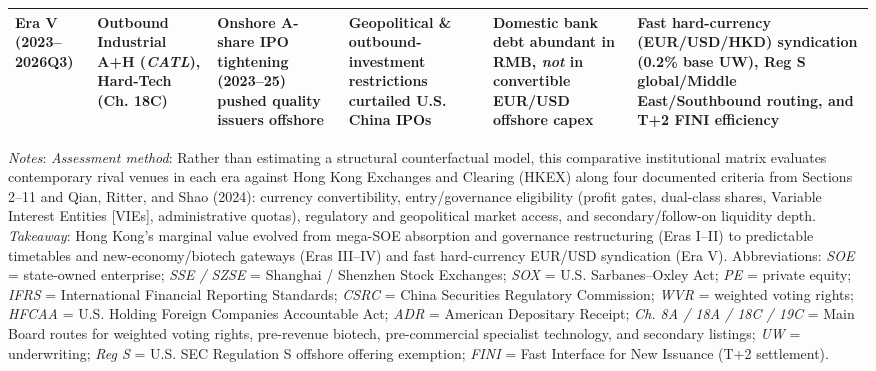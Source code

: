 \documentclass[11pt,letterpaper]{article}
\begin{document}
\begin{table}[!htbp]
\begin{adjustbox}{max width=\textwidth,max totalheight=0.79\textheight}
\begin{minipage}{\textwidth}
\begin{adjustbox}{max width=\textwidth}
\begin{tabular}{l>{\raggedright\arraybackslash}p{2.90cm}>{\raggedright\arraybackslash}p{2.90cm}>{\raggedright\arraybackslash}p{2.90cm}>{\raggedright\arraybackslash}p{2.90cm}>{\raggedright\arraybackslash}p{2.90cm}}
\textbf{Era V (2023–2026Q3)} & Outbound Industrial A+H (\textit{CATL}), Hard-Tech (Ch. 18C) & Onshore \textbf{A-share IPO tightening (2023–25)} pushed quality issuers offshore & Geopolitical \& outbound-investment restrictions curtailed U.S. China IPOs & Domestic bank debt abundant in RMB, \textit{not} in convertible EUR/USD offshore capex & \textbf{Fast hard-currency (EUR/USD/HKD) syndication (0.2\% base UW), Reg S global/Middle East/Southbound routing, and T+2 FINI efficiency} \\
\bottomrule
\end{tabular}
\end{adjustbox}
\end{minipage}
\end{adjustbox}
\par\vspace{3pt}\noindent\parbox{\textwidth}{\scriptsize\raggedright \textit{Notes}: \textit{Assessment method}: Rather than estimating a structural counterfactual model, this comparative institutional matrix evaluates contemporary rival venues in each era against Hong Kong Exchanges and Clearing (HKEX) along four documented criteria from Sections 2–11 and Qian, Ritter, and Shao (2024): currency convertibility, entry/governance eligibility (profit gates, dual-class shares, Variable Interest Entities [VIEs], administrative quotas), regulatory and geopolitical market access, and secondary/follow-on liquidity depth. \textit{Takeaway}: Hong Kong's marginal value evolved from mega-SOE absorption and governance restructuring (Eras I–II) to predictable timetables and new-economy/biotech gateways (Eras III–IV) and fast hard-currency EUR/USD syndication (Era V). Abbreviations: \textit{SOE} = state-owned enterprise; \textit{SSE / SZSE} = Shanghai / Shenzhen Stock Exchanges; \textit{SOX} = U.S. Sarbanes–Oxley Act; \textit{PE} = private equity; \textit{IFRS} = International Financial Reporting Standards; \textit{CSRC} = China Securities Regulatory Commission; \textit{WVR} = weighted voting rights; \textit{HFCAA} = U.S. Holding Foreign Companies Accountable Act; \textit{ADR} = American Depositary Receipt; \textit{Ch. 8A / 18A / 18C / 19C} = Main Board routes for weighted voting rights, pre-revenue biotech, pre-commercial specialist technology, and secondary listings; \textit{UW} = underwriting; \textit{Reg S} = U.S. SEC Regulation S offshore offering exemption; \textit{FINI} = Fast Interface for New Issuance (T+2 settlement).}
\end{table}
\end{document}
